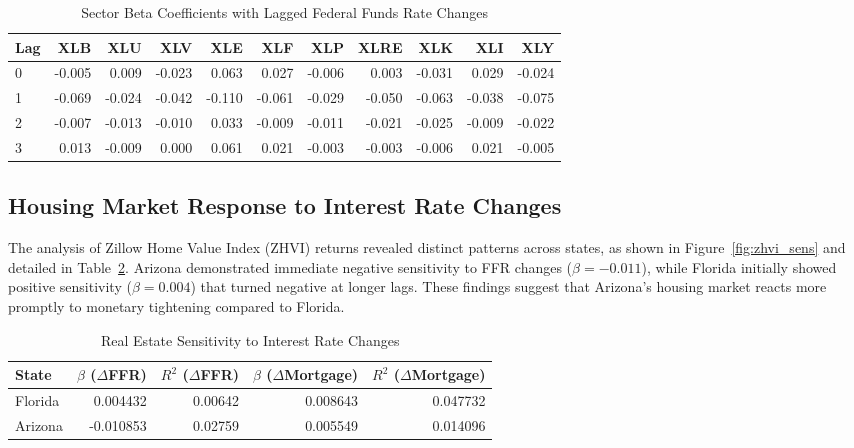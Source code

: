 \documentclass[12pt, stu, abstract]{apa7}
\begin{document}
\begin{table}[htbp]
\centering
\caption{Sector Beta Coefficients with Lagged Federal Funds Rate Changes}
\label{tab:sector_lags}
\begin{tabular}{lrrrrrrrrrr}
\toprule
Lag & XLB & XLU & XLV & XLE & XLF & XLP & XLRE & XLK & XLI & XLY \\
\midrule
0 & -0.005 & 0.009 & -0.023 & 0.063 & 0.027 & -0.006 & 0.003 & -0.031 & 0.029 & -0.024 \\
1 & -0.069 & -0.024 & -0.042 & -0.110 & -0.061 & -0.029 & -0.050 & -0.063 & -0.038 & -0.075 \\
2 & -0.007 & -0.013 & -0.010 & 0.033 & -0.009 & -0.011 & -0.021 & -0.025 & -0.009 & -0.022 \\
3 & 0.013 & -0.009 & 0.000 & 0.061 & 0.021 & -0.003 & -0.003 & -0.006 & 0.021 & -0.005 \\
\bottomrule
\end{tabular}
\end{table}

\subsection{Housing Market Response to Interest Rate Changes}

The analysis of Zillow Home Value Index (ZHVI) returns revealed distinct patterns across states, as shown in Figure~\ref{fig:zhvi_sens} and detailed in Table~\ref{tab:realestate_reg}. Arizona demonstrated immediate negative sensitivity to FFR changes ($\beta = -0.011$), while Florida initially showed positive sensitivity ($\beta = 0.004$) that turned negative at longer lags. These findings suggest that Arizona's housing market reacts more promptly to monetary tightening compared to Florida.

\begin{table}[htbp]
\centering
\caption{Real Estate Sensitivity to Interest Rate Changes}
\label{tab:realestate_reg}
\begin{tabular}{lrrrr}
\toprule
State & $\beta$ ($\Delta$FFR) & $R^2$ ($\Delta$FFR) & $\beta$ ($\Delta$Mortgage) & $R^2$ ($\Delta$Mortgage) \\
\midrule
Florida & 0.004432 & 0.00642 & 0.008643 & 0.047732 \\
Arizona & -0.010853 & 0.02759 & 0.005549 & 0.014096 \\
\bottomrule
\end{tabular}
\end{table}
\end{document}
